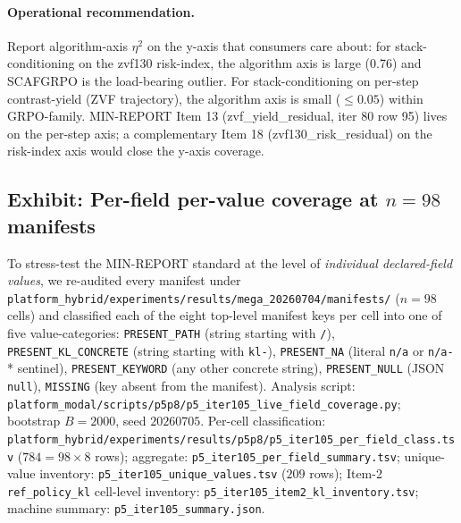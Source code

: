 \documentclass{article}  \usepackage[preprint,nonatbib]{neurips_2026} \usepackage[numbers]{natbib}
\begin{document}
\paragraph{Operational recommendation.}
Report algorithm-axis $\eta^2$ on the y-axis that consumers
care about: for stack-conditioning on the zvf130 risk-index,
the algorithm axis is large (0.76) and SCAFGRPO is the
load-bearing outlier. For stack-conditioning on per-step
contrast-yield (ZVF trajectory), the algorithm axis is small
($\leq 0.05$) within GRPO-family. MIN-REPORT Item 13
(zvf\_yield\_residual, iter 80 row 95) lives on the per-step
axis; a complementary Item 18 (zvf130\_risk\_residual) on the
risk-index axis would close the y-axis coverage.

 \subsection{Exhibit: Per-field per-value coverage at $n{=}98$ manifests}
\label{sec:p5-iter105-coverage}

To stress-test the MIN-REPORT standard at the level of \emph{individual
declared-field values}, we re-audited every manifest under
\texttt{platform_hybrid/experiments/results/mega\_20260704/manifests/} ($n{=}98$ cells)
and classified each of the eight top-level manifest keys per cell into
one of five value-categories: \texttt{PRESENT\_PATH} (string starting with
\texttt{/}), \texttt{PRESENT\_KL\_CONCRETE} (string starting with
\texttt{kl-}), \texttt{PRESENT\_NA} (literal \texttt{n/a} or
\texttt{n/a-}* sentinel), \texttt{PRESENT\_KEYWORD} (any other concrete
string), \texttt{PRESENT\_NULL} (JSON \texttt{null}), \texttt{MISSING}
(key absent from the manifest). Analysis script:
\texttt{platform_modal/scripts/p5p8/p5\_iter105\_live\_field\_coverage.py}; bootstrap
$B{=}2000$, seed $20260705$. Per-cell classification:
\texttt{platform_hybrid/experiments/results/p5p8/p5\_iter105\_per\_field\_class.tsv}
($784{=}98{\times}8$ rows); aggregate:
\texttt{p5\_iter105\_per\_field\_summary.tsv}; unique-value inventory:
\texttt{p5\_iter105\_unique\_values.tsv} ($209$ rows); Item-2
\texttt{ref\_policy\_kl} cell-level inventory:
\texttt{p5\_iter105\_item2\_kl\_inventory.tsv}; machine summary:
\texttt{p5\_iter105\_summary.json}.
\end{document}
